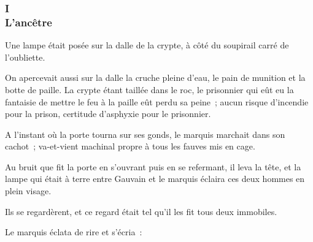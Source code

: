 \documentclass[french,twoside]{book} %
\begin{document}
\subsubsection[{I. L’ancêtre}]{I \\
L’ancêtre}
\label{p3l7c1}
\noindent Une lampe était posée sur la dalle de la crypte, à côté du soupirail carré de l’oubliette.\par
On apercevait aussi sur la dalle la cruche pleine d’eau, le pain de munition et la botte de paille. La crypte étant taillée dans le roc, le prisonnier qui eût eu la fantaisie de mettre le feu à la paille eût perdu sa peine ; aucun risque d’incendie pour la prison, certitude d’asphyxie pour le prisonnier.\par
A l’instant où la porte tourna sur ses gonds, le marquis marchait dans son cachot ; va-et-vient machinal propre à tous les fauves mis en cage.\par
Au bruit que fit la porte en s’ouvrant puis en se refermant, il leva la tête, et la lampe qui était à terre entre Gauvain et le marquis éclaira ces deux hommes en plein visage.\par
 Ils se regardèrent, et ce regard était tel qu’il les fit tous deux immobiles.\par
Le marquis éclata de rire et s’écria :\par
\end{document}
